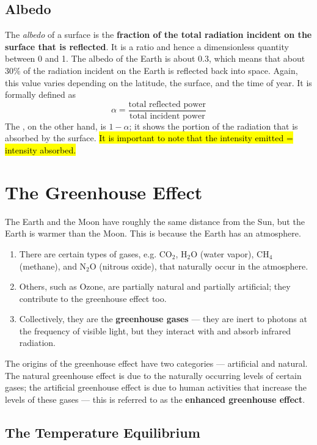 \documentclass[a4paper,12pt]{article}
\let\oldsection\section
\renewcommand\section{\clearpage\oldsection}
\begin{document}
\pagebreak

\subsection{Albedo}

The \textit{albedo} of a surface is the \textbf{fraction of the total radiation incident on the surface that is reflected}. It is a ratio and hence a dimensionless quantity between 0 and 1. The albedo of the Earth is about 0.3, which means that about 30\% of the radiation incident on the Earth is reflected back into space. Again, this value varies depending on the latitude, the surface, and the time of year.
It is formally defined as
$$\alpha = \frac{\text{total reflected power}}{\text{total incident power}}$$
The , on the other hand, is $1 - \alpha$; it shows the portion of the radiation that is absorbed by the surface.
\hl{It is important to note that the intensity emitted = intensity absorbed.}


\section{The Greenhouse Effect}

The Earth and the Moon have roughly the same distance from the Sun, but the Earth is warmer than the Moon. This is because the Earth has an atmosphere.
\begin{enumerate}
  \item There are certain types of gases, e.g. CO$_2$, H$_2$O (water vapor), CH$_4$ (methane), and N$_2$O (nitrous oxide), that naturally occur in the atmosphere.
  \item Others, such as Ozone, are partially natural and partially artificial; they contribute to the greenhouse effect too.
  \item Collectively, they are the \textbf{greenhouse gases} --- they are inert to photons at the frequency of visible light, but they interact with and absorb infrared radiation.
\end{enumerate}
The origins of the greenhouse effect have two categories --- artificial and natural. The natural greenhouse effect is due to the naturally occurring levels of certain gases; the artificial greenhouse effect is due to human activities that increase the levels of these gases --- this is referred to as the \textbf{enhanced greenhouse effect}.

\subsection{The Temperature Equilibrium}
\end{document}
